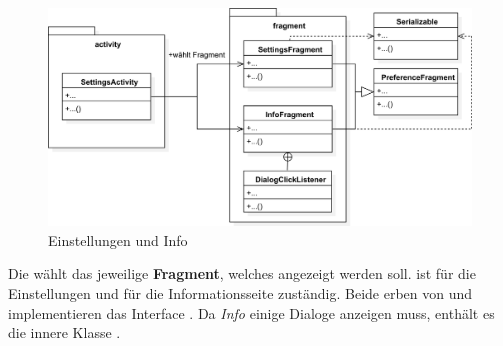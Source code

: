 \begin{figure}[h]
	\centering
	\includegraphics[width=1.0\textwidth]{resources/settingsandinfo/SettingsAndInfo}
	\caption{Einstellungen und Info}
\end{figure}

Die  wählt das jeweilige \textbf{Fragment}, welches
angezeigt werden soll.  ist für die Einstellungen und
 für die Informationsseite zuständig. Beide erben von
und implementieren das Interface
. Da \emph{Info} einige Dialoge anzeigen muss, enthält es
die innere Klasse .

